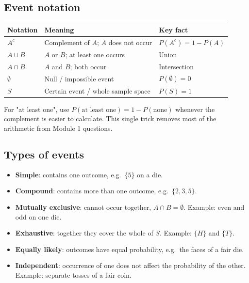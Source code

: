 \documentclass[11pt,a4paper]{article}
\begin{document}
\subsection{Event notation}

\begin{center}\small
\begin{tabularx}{\textwidth}{>{\bfseries}p{} X X}
\toprule Notation & Meaning & Key fact\\\midrule
$A^c$ & Complement of $A$; $A$ does not occur & $P(A^c)=1-P(A)$\\
$A\cup B$ & $A$ or $B$; at least one occurs & Union\\
$A\cap B$ & $A$ and $B$; both occur & Intersection\\
$\emptyset$ & Null / impossible event & $P(\emptyset)=0$\\
$S$ & Certain event / whole sample space & $P(S)=1$\\
\end{tabularx}
\end{center}

\begin{rememberbox}
For "at least one", use $P(\text{at least one})=1-P(\text{none})$ whenever the complement is easier to calculate. This single trick removes most of the arithmetic from Module 1 questions.
\end{rememberbox}

\subsection{Types of events}

\begin{itemize}
\item \textbf{Simple}: contains one outcome, e.g.\ $\{5\}$ on a die.
\item \textbf{Compound}: contains more than one outcome, e.g.\ $\{2,3,5\}$.
\item \textbf{Mutually exclusive}: cannot occur together, $A\cap B=\emptyset$. Example: even and odd on one die.
\item \textbf{Exhaustive}: together they cover the whole of $S$. Example: $\{H\}$ and $\{T\}$.
\item \textbf{Equally likely}: outcomes have equal probability, e.g.\ the faces of a fair die.
\item \textbf{Independent}: occurrence of one does not affect the probability of the other. Example: separate tosses of a fair coin.
\end{itemize}
\end{document}
